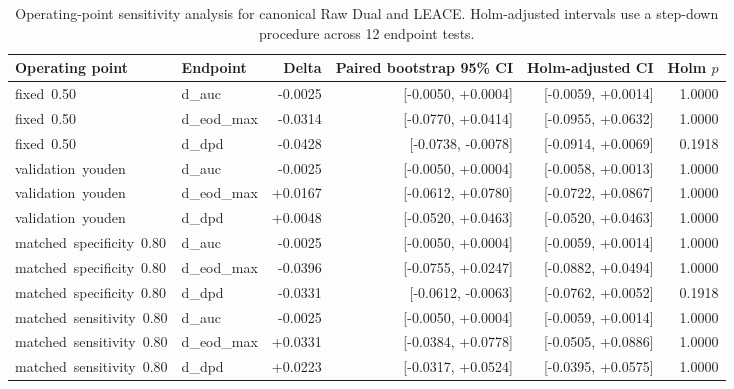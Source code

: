 \begin{table}[htbp]
\centering
\small
\caption{Operating-point sensitivity analysis for canonical Raw Dual and LEACE. Holm-adjusted intervals use a step-down procedure across 12 endpoint tests.}
\label{tab:operating-points-final}
\begin{tabular}{llrrrr}
\toprule
Operating point & Endpoint & Delta & Paired bootstrap 95\% CI & Holm-adjusted CI & Holm $p$ \\
\midrule
fixed\ 0.50 & d\_auc & -0.0025 & [-0.0050, +0.0004] & [-0.0059, +0.0014] & 1.0000 \\
fixed\ 0.50 & d\_eod\_max & -0.0314 & [-0.0770, +0.0414] & [-0.0955, +0.0632] & 1.0000 \\
fixed\ 0.50 & d\_dpd & -0.0428 & [-0.0738, -0.0078] & [-0.0914, +0.0069] & 0.1918 \\
validation\ youden & d\_auc & -0.0025 & [-0.0050, +0.0004] & [-0.0058, +0.0013] & 1.0000 \\
validation\ youden & d\_eod\_max & +0.0167 & [-0.0612, +0.0780] & [-0.0722, +0.0867] & 1.0000 \\
validation\ youden & d\_dpd & +0.0048 & [-0.0520, +0.0463] & [-0.0520, +0.0463] & 1.0000 \\
matched\ specificity\ 0.80 & d\_auc & -0.0025 & [-0.0050, +0.0004] & [-0.0059, +0.0014] & 1.0000 \\
matched\ specificity\ 0.80 & d\_eod\_max & -0.0396 & [-0.0755, +0.0247] & [-0.0882, +0.0494] & 1.0000 \\
matched\ specificity\ 0.80 & d\_dpd & -0.0331 & [-0.0612, -0.0063] & [-0.0762, +0.0052] & 0.1918 \\
matched\ sensitivity\ 0.80 & d\_auc & -0.0025 & [-0.0050, +0.0004] & [-0.0059, +0.0014] & 1.0000 \\
matched\ sensitivity\ 0.80 & d\_eod\_max & +0.0331 & [-0.0384, +0.0778] & [-0.0505, +0.0886] & 1.0000 \\
matched\ sensitivity\ 0.80 & d\_dpd & +0.0223 & [-0.0317, +0.0524] & [-0.0395, +0.0575] & 1.0000 \\
\bottomrule
\end{tabular}
\end{table}

